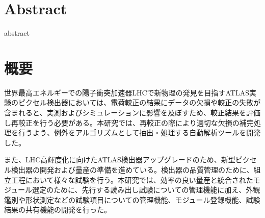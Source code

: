\chapter*{Abstract}

abstract


\newpage

\chapter*{概要}

世界最高エネルギーでの陽子衝突加速器LHCで新物理の発見を目指すATLAS実験のピクセル検出器においては、電荷較正の結果にデータの欠損や較正の失敗が含まれると、実測およびシミュレーションに影響を及ぼすため、較正結果を評価し再較正を行う必要がある。本研究では、再較正の際により適切な欠損の補完処理を行うよう、例外をアルゴリズムとして抽出・処理する自動解析ツールを開発した。

また、LHC高輝度化に向けたATLAS検出器アップグレードのため、新型ピクセル検出器の開発および量産の準備を進めている。検出器の品質管理のために、組立工程において様々な試験を行う。本研究では、効率の良い量産と統合されたモジュール選定のために、先行する読み出し試験についての管理機能に加え、外観鑑別や形状測定などの試験項目についての管理機能、モジュール登録機能、試験結果の共有機能の開発を行った。
